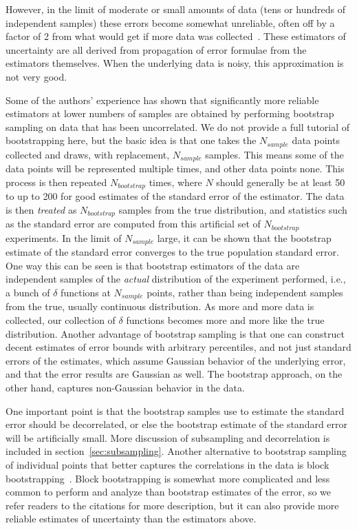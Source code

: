 \documentclass[9pt,bestpractices]{livecoms}
\begin{document}
However, in the limit of moderate or small amounts of data (tens or hundreds of independent samples) these errors become somewhat unreliable, often off by a factor of 2 from what would get if more data was collected~\cite{???}. These estimators of uncertainty are all derived from propagation of error formulae from the estimators themselves. When the underlying data is noisy, this approximation is not very good.

Some of the authors' experience has shown that significantly more reliable estimators at lower numbers of samples are obtained by performing bootstrap sampling on data that has been uncorrelated. We do not provide a full tutorial of bootstrapping here, but the basic idea is that one takes the $N_{sample}$ data points collected and draws, with replacement, $N_{sample}$ samples.  This means some of the data points will be represented multiple times, and other data points none. This process is then repeated $N_{bootstrap}$ times, where $N$ should generally be at least 50 to up to 200 for good estimates of the standard error of the estimator.  The data is then \textit{treated} as $N_{bootstrap}$ samples from the true distribution, and statistics such as the standard error are computed from this artificial set of $N_{bootstrap}$ experiments.  In the limit of $N_{sample}$ large, it can be shown that the bootstrap estimate of the standard error converges to the true population standard error.  One way this can be seen is that bootstrap estimators of the data are independent samples of the \textit{actual} distribution of the experiment performed, i.e., a bunch of $\delta$ functions at $N_{sample}$ points, rather than being independent samples from the true, usually continuous distribution.  As more and more data is collected, our collection of $\delta$ functions becomes more and more like the true distribution. Another advantage of bootstrap sampling is that one can construct decent estimates of error bounds with arbitrary percentiles, and not just standard errors of the estimates, which assume Gaussian behavior of the underlying error, and that the error results are Gaussian as well.  The bootstrap approach, on the other hand, captures non-Gaussian behavior in the data. 

One important point is that the bootstrap samples use to estimate the standard error should be decorrelated, or else the bootstrap estimate of the standard error will be artificially small.  More discussion of subsampling and decorrelation is included in section~\ref{sec:subsampling}. Another alternative to bootstrap sampling of individual points that better captures the correlations in the data is block bootstrapping~\cite{???}.  Block bootstrapping is somewhat more complicated and less common to perform and analyze than bootstrap estimates of the error, so we refer readers to the citations for more description, but it can also provide more reliable estimates of uncertainty than the estimators above.
\end{document}
